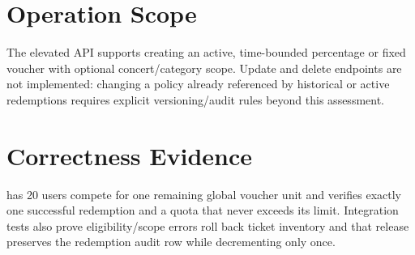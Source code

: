 \section{Operation Scope}
The elevated API supports creating an active, time-bounded percentage or fixed
voucher with optional concert/category scope. Update and delete endpoints are
not implemented: changing a policy already referenced by historical or active
redemptions requires explicit versioning/audit rules beyond this assessment.

\section{Correctness Evidence}
 has 20 users compete for one remaining global voucher unit and
verifies exactly one successful redemption and a quota that never exceeds its
limit. Integration tests also prove eligibility/scope errors roll back ticket
inventory and that release preserves the redemption audit row while decrementing
 only once.
